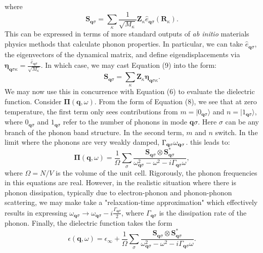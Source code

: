 \documentclass[aps,prb,twocolumn,
	groupedaddress,superscriptaddress,
	amsfonts,amssymb,amsmath,floatfix,
	citeautoscript]{revtex4-1}
\begin{document}
where 
\begin{equation}
\mathbf{S}_{\mathbf{q}\sigma} = \sum\limits_{\kappa} \frac{1}{\sqrt{M_{\kappa}}}\mathbf{Z}_{\kappa}\hat{e}_{\mathbf{q}\sigma}(\mathbf{R}_{\kappa}).
\end{equation}
This can be expressed in terms of more standard outputs of \emph{ab initio} materials physics methods that calculate phonon properties. In particular, we can take $\hat{e}_{\mathbf{q}\sigma}$, the eigenvectors of the dynamical matrix, and define eigendisplacements via $\boldsymbol{\eta}_{\mathbf{q}\sigma\kappa}=\frac{\hat{e}_{\mathbf{q}\sigma}}{\sqrt{M_{\kappa}}}$. In which case, we may cast Equation (9) into the form:
\begin{equation}
\mathbf{S}_{\mathbf{q}\sigma} = \sum\limits_{\kappa} \mathbf{Z}_{\kappa}\boldsymbol{\eta}_{\mathbf{q}\sigma\kappa}.
\end{equation}
We may now use this in concurrence with Equation (6) to evaluate the dielectric function. Consider $\boldsymbol{\Pi}(\mathbf{q},\omega)$. From the form of Equation (8), we see that at zero temperature, the first term only sees contributions from $m=|0_{\mathbf{q}\sigma}\rangle$ and $n=|1_{\mathbf{q}\sigma}\rangle$, where $0_{\mathbf{q}\sigma}$ and $1_{\mathbf{q}\sigma}$ refer to the number of phonons in mode $\mathbf{q}\sigma$. Here $\sigma$ can be any branch of the phonon band structure. In the second term, $m$ and $n$ switch. In the limit where the phonons are very weakly damped, $\Gamma_{\mathbf{q}\sigma} \\ \omega_{\mathbf{q}\sigma}$. this leads to:
\begin{equation}
\boldsymbol{\Pi}(\mathbf{q},\omega) = \frac{1}{\Omega}\sum\limits_{\sigma}\frac{\mathbf{S}_{\mathbf{q}\sigma}\otimes \mathbf{S}_{\mathbf{q}\sigma}^*}{\omega^2_{\mathbf{q}\sigma}-\omega^2-i\Gamma_{\mathbf{q}\sigma}\omega},
\end{equation}
where $\Omega=N/V$ is the volume of the unit cell. Rigorously, the phonon frequencies in this equations are real. However, in the realistic situation where there is phonon dissipation, typically due to electron-phonon and phonon-phonon scattering, we may make take a "relaxation-time approximation" which effectively results in expressing $\omega_{\mathbf{q}\sigma} \rightarrow \omega_{\mathbf{q}\sigma} - i\frac{\Gamma_{\mathbf{q}\sigma}}{2}$, where $\Gamma_{\mathbf{q}\sigma}$ is the dissipation rate of the phonon. Finally, the dielectric function takes the form
\begin{equation}
\epsilon(\mathbf{q},\omega) = \epsilon_{\infty} + \frac{1}{\Omega}\sum\limits_{\sigma}\frac{\mathbf{S}_{\mathbf{q}\sigma}\otimes \mathbf{S}_{\mathbf{q}\sigma}^*}{\omega^2_{\mathbf{q}\sigma}-\omega^2-i\Gamma_{\mathbf{q}\sigma}\omega}.
\end{equation}
\end{document}
